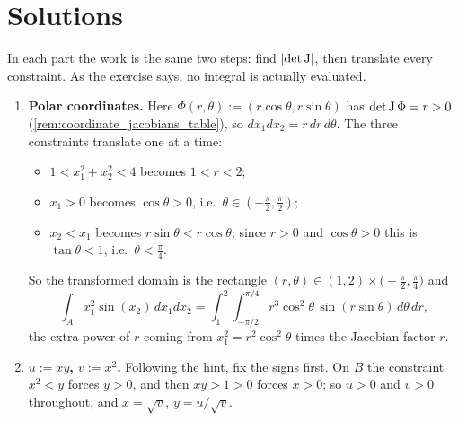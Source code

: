 \section{Solutions}
\label{sec:change_of_variables_solutions}

\begin{exercisesolution}
\label{sol:change_of_variables_computations}
In each part the work is the same two steps: find $\lvert\det\operatorname{J}\rvert$, then translate every
constraint. As the exercise says, no integral is actually evaluated.
\begin{enumerate}[label=\textbf{(\alph*)}]
  \item \textbf{Polar coordinates.} Here $\Phi(r,\theta) := (r\cos\theta, r\sin\theta)$ has
    $\det\operatorname{J}\Phi = r > 0$ (\cref{rem:coordinate_jacobians_table}), so
    $dx_1dx_2 = r\,dr\,d\theta$. The three constraints translate one at a time:
    \begin{itemize}
      \item $1 < x_1^2+x_2^2 < 4$ becomes $1 < r < 2$;
      \item $x_1 > 0$ becomes $\cos\theta > 0$, i.e.\ $\theta \in (-\tfrac\pi2, \tfrac\pi2)$;
      \item $x_2 < x_1$ becomes $r\sin\theta < r\cos\theta$; since $r > 0$ and $\cos\theta > 0$
        this is $\tan\theta < 1$, i.e.\ $\theta < \tfrac\pi4$.
    \end{itemize}
    So the transformed domain is the rectangle
    $(r,\theta) \in (1,2)\times\big(-\tfrac\pi2,\tfrac\pi4\big)$ and
    \[\int_A x_1^2\sin(x_2)\,dx_1dx_2
      = \int_{1}^{2}\!\!\int_{-\pi/2}^{\pi/4} r^3\cos^2\theta\,\sin(r\sin\theta)\,d\theta\,dr,\]
    the extra power of $r$ coming from $x_1^2 = r^2\cos^2\theta$ times the Jacobian factor $r$.
  \item \textbf{$u := xy$, $v := x^2$.} Following the hint, fix the signs first. On $B$
    the constraint $x^2 < y$ forces $y > 0$, and then $xy > 1 > 0$ forces $x > 0$; so
    $u > 0$ and $v > 0$ throughout, and $x = \sqrt v$, $y = u/\sqrt v$.


\end{enumerate}
\end{exercisesolution}
